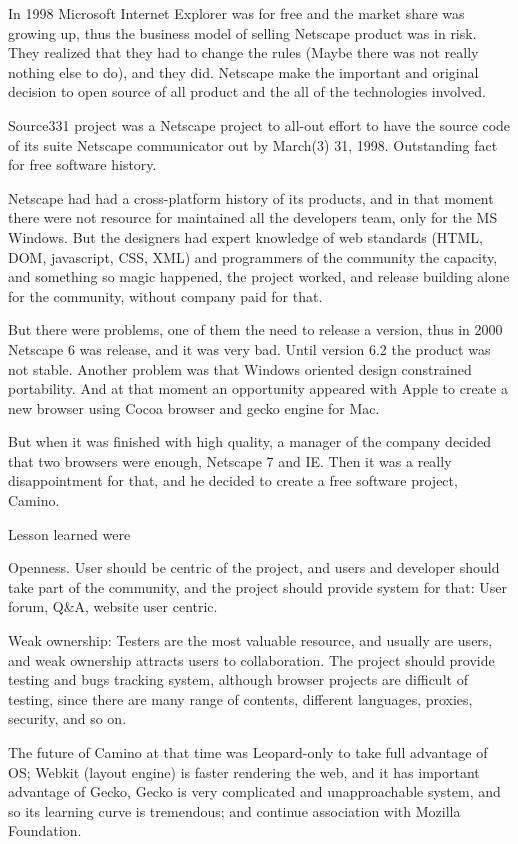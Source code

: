 \documentclass[11pt]{article}
\begin{document}
In 1998 Microsoft Internet Explorer was for free and the market share was growing up, thus the business model of selling Netscape product was in risk. They realized that they had to change the rules (Maybe there was not really nothing else to do), and they did. Netscape make the important and original decision to open source of all product and the all of the technologies involved.

Source331 project was a Netscape project to all-out effort to have the source code of its suite Netscape communicator out by March(3) 31, 1998. Outstanding fact for free software history.

Netscape had had a cross-platform history of its products, and in that moment there were not resource for maintained all the developers team, only for the MS Windows. But the designers had expert knowledge of web standards (HTML, DOM, javascript, CSS, XML) and programmers of the community the capacity, and something so magic happened, the project worked, and release building alone for the community, without company paid for that.

But there were problems, one of them the need to release a version, thus in 2000 Netscape 6 was release, and it was very bad. Until version 6.2 the product was not stable. Another problem was that Windows oriented design constrained portability. And at that moment an opportunity appeared with Apple to create a new browser using Cocoa browser and gecko engine for Mac. 

But when it was finished with high quality, a manager of the company decided that two browsers were enough, Netscape 7 and IE. Then it was a really disappointment for that, and he decided to create a free software project, Camino.

Lesson learned were

Openness. User should be centric of the project, and users and developer should take part of the community, and the project should provide system for that: User forum, Q\&A, website user centric.

Weak ownership:	Testers are the most valuable resource, and usually are users, and weak ownership attracts users to collaboration. The project should provide testing and bugs tracking system, although browser projects are difficult of testing, since there are many range of contents, different languages, proxies, security, and so on.
	
The future of Camino at that time was Leopard-only to take full advantage of OS; 	Webkit (layout engine) is faster rendering the web, and it has important advantage of Gecko, Gecko is very complicated and unapproachable system,  and so its learning curve is tremendous; and continue association with Mozilla Foundation.
	
\end{document}
